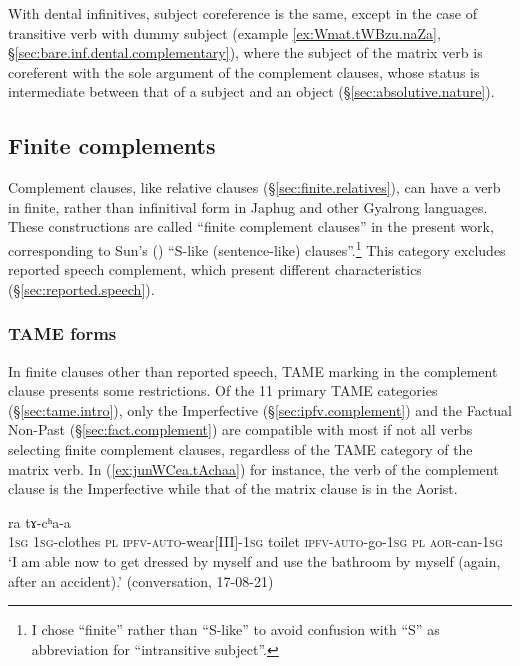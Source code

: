 With dental infinitives, subject coreference is the same, except in the case of transitive verb with dummy subject (example \ref{ex:Wmat.tWBzu.naZa}, §\ref{sec:bare.inf.dental.complementary}), where the subject of the matrix verb is coreferent with the sole argument of the complement clauses, whose status is intermediate between that of a subject and an object (§\ref{sec:absolutive.nature}).

 \subsection{Finite complements} \label{sec:finite.complement}
 Complement clauses, like relative clauses (§\ref{sec:finite.relatives}), can have a verb in finite, rather than infinitival form in Japhug and other Gyalrong languages. These constructions are called ``finite complement clauses'' in the present work, corresponding to Sun's (\citeyear[475-477]{sun12complementation})  ``S-like (sentence-like) clauses''.\footnote{I chose ``finite'' rather than ``S-like'' to avoid confusion with ``S'' as abbreviation for ``intransitive subject''.   } This category excludes reported speech complement, which present different characteristics (§\ref{sec:reported.speech}).

 \subsubsection{TAME forms} \label{sec:TAM.finite}
In finite clauses other than reported speech, TAME marking in the complement clause presents some restrictions. Of the 11 primary TAME categories (§\ref{sec:tame.intro}), only the Imperfective (§\ref{sec:ipfv.complement}) and the Factual Non-Past (§\ref{sec:fact.complement}) are compatible with most if not all verbs selecting finite complement clauses, regardless of the TAME category of the matrix verb. In (\ref{ex:junWCea.tAchaa}) for instance, the verb of the complement clause is the Imperfective while that of the matrix clause is in the Aorist.

\begin{exe}
\ex \label{ex:junWCea.tAchaa}
  ra tɤ-cʰa-a \\
 \textsc{1sg} \textsc{1sg}-clothes \textsc{pl} \textsc{ipfv}-\textsc{auto}-wear[III]-\textsc{1sg} toilet \textsc{ipfv}-\textsc{auto}-go-\textsc{1sg} \textsc{pl} \textsc{aor}-can-\textsc{1sg} \\
 \glt  `I am able now to get dressed by myself and use the bathroom by myself (again, after an accident).' (conversation, 17-08-21)
 \end{exe}

